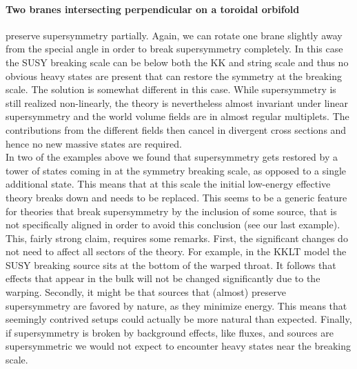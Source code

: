 \documentclass[a4paper,12pt]{report}
\begin{document}
\paragraph{Two branes intersecting perpendicular on a toroidal orbifold} preserve supersymmetry partially. Again, we can rotate one brane slightly away from the special angle in order to break supersymmetry completely. In this case the SUSY breaking scale can be below both the KK and string scale and thus no obvious heavy states are present that can restore the symmetry at the breaking scale. The solution is somewhat different in this case. While supersymmetry is still realized non-linearly, the theory is nevertheless almost invariant under linear supersymmetry and the world volume fields are in almost regular multiplets. The contributions from the different fields then cancel in divergent cross sections and hence no new massive states are required.\vspace{12pt}\\ %
In two of the examples above we found that supersymmetry gets restored by a tower of states coming in at the symmetry breaking scale, as opposed to a single additional state. This means that at this scale the initial low-energy effective theory breaks down and needs to be replaced. This seems to be a generic feature for theories that break supersymmetry by the inclusion of some source, that is not specifically aligned in order to avoid this conclusion (see our last example).\\
This, fairly strong claim, requires some remarks. First, the significant changes do not need to affect all sectors of the theory. For example, in the KKLT model the SUSY breaking source sits at the bottom of the warped throat. It follows that effects that appear in the bulk will not be changed significantly due to the warping. Secondly, it might be that sources that (almost) preserve supersymmetry are favored by nature, as they minimize energy. This means that seemingly contrived setups could actually be more natural than expected. Finally, if supersymmetry is broken by background effects, like fluxes, and sources are supersymmetric we would not expect to encounter heavy states near the breaking scale.
\end{document}
